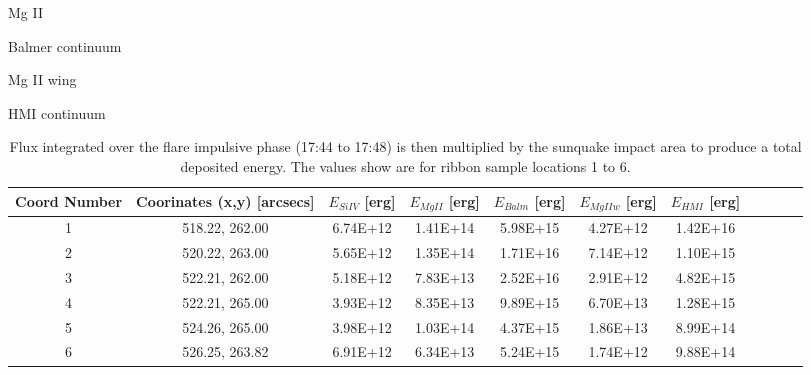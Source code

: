 Mg II

Balmer continuum

Mg II wing

HMI continuum    


\begin{table}
\tiny
\centering
\begin{tabular}{|c|c|c|c|c|c|c|c|c|c|c|}
Coord Number & Coorinates (x,y) [arcsecs] & $E_{Si IV}$ [erg] & $E_{Mg II}$ [erg] & $E_{Balm}$ [erg] & $E_{Mg II w}$ [erg] & $E_{HMI}$ [erg]\\
\hline
1 & 518.22, 262.00 & 6.74E+12 & 1.41E+14 & 5.98E+15 & 4.27E+12 & 1.42E+16\\
2 & 520.22, 263.00 & 5.65E+12 & 1.35E+14 & 1.71E+16 & 7.14E+12 & 1.10E+15\\
3 & 522.21, 262.00 & 5.18E+12 & 7.83E+13 & 2.52E+16 & 2.91E+12 & 4.82E+15\\
4 & 522.21, 265.00 & 3.93E+12 & 8.35E+13 & 9.89E+15 & 6.70E+13 & 1.28E+15\\
5 & 524.26, 265.00 & 3.98E+12 & 1.03E+14 & 4.37E+15 & 1.86E+13 & 8.99E+14\\
6 & 526.25, 263.82 & 6.91E+12 & 6.34E+13 & 5.24E+15 & 1.74E+12 & 9.88E+14\\
\end{tabular}
\caption{Flux integrated over the flare impulsive phase (17:44 to 17:48) is then multiplied by the sunquake impact area to produce a total deposited energy. The values show are for ribbon sample locations 1 to 6.}\label{eimp}
\end{table}



